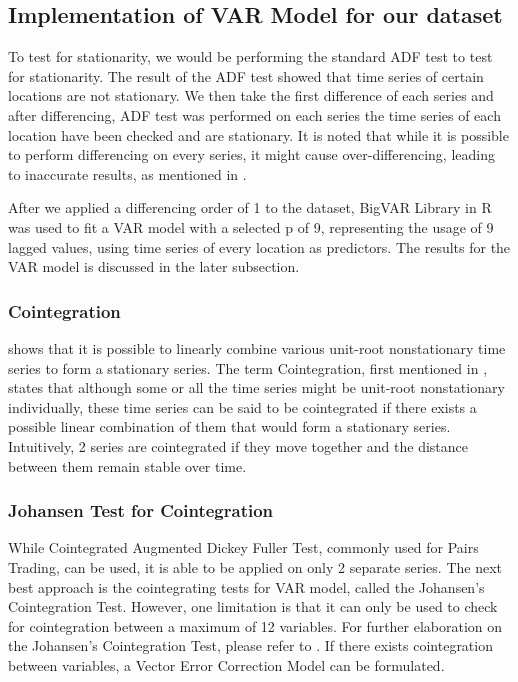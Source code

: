 \documentclass[12pt, letterpaper] {article}
\begin{document}
\subsection{Implementation of VAR Model for our dataset}

To test for stationarity, we would be performing the standard ADF test to test for stationarity. The result of the ADF test showed that time series of certain locations are not stationary. We then take the first difference of each series and after differencing, ADF test was performed on each series the time series of each location have been checked and are stationary. It is noted that while it is possible to perform differencing on every series, it might cause over-differencing, leading to inaccurate results, as mentioned in \cite{Ruey2014}.

\noindent After we applied a differencing order of 1 to the dataset, BigVAR Library in R was used to fit a VAR model with a selected p of 9, representing the usage of 9 lagged values, using time series of every location as predictors. The results for the VAR model is discussed in the later subsection. 


\subsubsection{Cointegration}
\cite{Box1977} shows that it is possible to linearly combine various unit-root nonstationary time series to form a stationary series. The term Cointegration, first mentioned in \cite{Granger1983}, states that although some or all the time series might be unit-root nonstationary individually, these time series can be said to be cointegrated if there exists a possible linear combination of them that would form a stationary series. Intuitively, 2 series are cointegrated if they move together and the distance between them remain stable over time. 

\subsubsection{Johansen Test for Cointegration}
While Cointegrated Augmented Dickey Fuller Test, commonly used for Pairs Trading, can be used, it is able to be applied on only 2 separate series. The next best approach is the cointegrating tests for VAR model, called the Johansen's Cointegration Test. However, one limitation is that it can only be used to check for cointegration between a maximum of 12 variables. For further elaboration on the Johansen's Cointegration Test, please refer to \cite{Johansen1991}. If there exists cointegration between variables, a Vector Error Correction Model can be formulated. 
\end{document}
